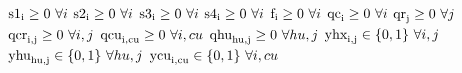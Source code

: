 \documentclass[11pt]{article}
\begin{document}
\begin{math}\text{s1}_{\text{i}}\geq 0 ~ \forall i\\\end{math}
\begin{math}\text{s2}_{\text{i}}\geq 0 ~ \forall i\\\end{math}
\begin{math}\text{s3}_{\text{i}}\geq 0 ~ \forall i\\\end{math}
\begin{math}\text{s4}_{\text{i}}\geq 0 ~ \forall i\\\end{math}
\begin{math}\text{f}_{\text{i}}\geq 0 ~ \forall i\\\end{math}
\begin{math}\text{qc}_{\text{i}}\geq 0 ~ \forall i\\\end{math}
\begin{math}\text{qr}_{\text{j}}\geq 0 ~ \forall j\\\end{math}
\begin{math}\text{qcr}_{\text{i},\text{j}}\geq 0 ~ \forall i,j\\\end{math}
\begin{math}\text{qcu}_{\text{i},\text{cu}}\geq 0 ~ \forall i,cu\\\end{math}
\begin{math}\text{qhu}_{\text{hu},\text{j}}\geq 0 ~ \forall hu,j\\\end{math}
\begin{math}\text{yhx}_{\text{i},\text{j}}\in \{0,1\} ~ \forall i,j\\\end{math}
\begin{math}\text{yhu}_{\text{hu},\text{j}}\in \{0,1\} ~ \forall hu,j\\\end{math}
\begin{math}\text{ycu}_{\text{i},\text{cu}}\in \{0,1\} ~ \forall i,cu\\\end{math}
\end{document}
